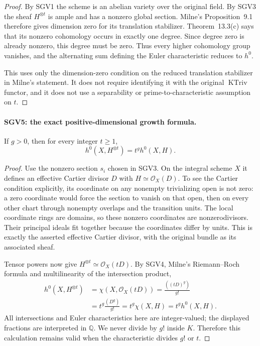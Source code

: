\documentclass[11pt,a4paper]{article}
\numberwithin{equation}{section}
\theoremstyle{remark}\newtheorem{remark}[theorem]{Remark}
\begin{document}
\begin{proof}
By SGV1 the scheme is an abelian variety over the original field.
By SGV3 the sheaf $H^{\otimes t}$ is ample and has a nonzero
global section.  Milne's Proposition~9.1 therefore gives dimension
zero for its translation stabilizer.  Theorem~13.3(c) says that its
nonzero cohomology occurs in exactly one degree.  Since degree zero
is already nonzero, this degree must be zero.  Thus every higher
cohomology group vanishes, and the alternating sum defining the Euler
characteristic reduces to $h^0$.

This uses only the dimension-zero condition on the reduced translation
stabilizer in Milne's statement.  It does not require identifying it
with the original $\operatorname{KTriv}$ functor, and it does not use a
separability or prime-to-characteristic assumption on $t$.
\end{proof}

\paragraph{SGV5: the exact positive-dimensional growth formula.}
\label{claim:SGV5}
If $g>0$, then for every integer $t\ge1$,
\[
 h^0(X,H^{\otimes t})=t^g h^0(X,H).
                                                        \tag{SGV.5}
\]

\begin{proof}
Use the nonzero section $s_i$ chosen in SGV3.  On the integral scheme
$X$ it defines an effective Cartier divisor $D$ with
$H\simeq\mathcal O_X(D)$.  To see the Cartier condition explicitly,
its coordinate on any nonempty trivializing open is not zero: a zero
coordinate would force the section to vanish on that open, then on
every other chart through nonempty overlaps and the transition units.
The local coordinate rings are domains, so these nonzero coordinates
are nonzerodivisors.  Their principal ideals fit together because the
coordinates differ by units.  This is exactly the asserted effective
Cartier divisor, with the original bundle as its associated sheaf.

Tensor powers now give $H^{\otimes t}\simeq\mathcal O_X(tD)$.
By SGV4, Milne's Riemann--Roch formula and multilinearity of the
intersection product,
\[
 \begin{aligned}
 h^0(X,H^{\otimes t})
   &=\chi(X,\mathcal O_X(tD))
     =\frac{((tD)^g)}{g!}\\
   &=t^g\frac{(D^g)}{g!}
     =t^g\chi(X,H)
     =t^g h^0(X,H).
 \end{aligned}
\]
All intersections and Euler characteristics here are integer-valued;
the displayed fractions are interpreted in $\mathbb Q$.  We never
divide by $g!$ inside $K$.  Therefore this calculation remains valid
when the characteristic divides $g!$ or $t$.
\end{proof}
\end{document}
